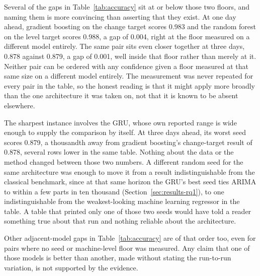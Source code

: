 \documentclass[12pt,a4paper]{report}
\begin{document}
Several of the gaps in Table~\ref{tab:accuracy} sit at or below those two
floors, and naming them is more convincing than asserting that they exist. At
one day ahead, gradient boosting on the change target scores 0.983 and the
random forest on the level target scores 0.988, a gap of 0.004, right at the
floor measured on a different model entirely. The same pair sits even closer
together at three days, 0.878 against 0.879, a gap of 0.001, well inside that
floor rather than merely at it. Neither pair can be ordered with any
confidence given a floor measured at that same size on a different model
entirely. The measurement was never repeated for every pair in the table, so
the honest reading is that it might apply more broadly than the one
architecture it was taken on, not that it is known to be absent elsewhere.

The sharpest instance involves the GRU, whose own reported range is wide
enough to supply the comparison by itself. At three days ahead, its worst
seed scores 0.879, a thousandth away from gradient boosting's change-target
result of 0.878, several rows lower in the same table. Nothing about the data
or the method changed between those two numbers. A different random seed for
the same architecture was enough to move it from a result indistinguishable
from the classical benchmark, since at that same horizon the GRU's best seed
ties ARIMA to within a few parts in ten thousand
(Section~\ref{sec:results-rq1}), to one indistinguishable from the
weakest-looking machine learning regressor in the table. A table that printed
only one of those two seeds would have told a reader something true about
that run and nothing reliable about the architecture.

Other adjacent-model gaps in Table~\ref{tab:accuracy} are of that order too,
even for pairs where no seed or machine-level floor was measured. Any claim
that one of those models is better than another, made without stating the run-to-run variation, is not supported by the evidence.
\end{document}
